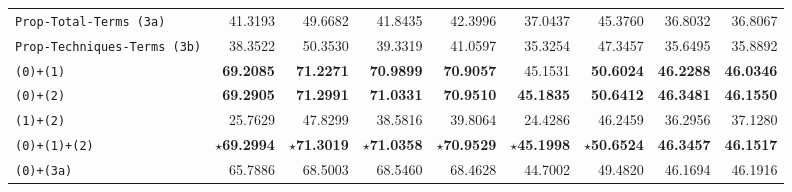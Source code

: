 \begin{table}[!htbp]
{\begin{tabular}{l|rr|rr|rr|rr}
            \texttt{Prop-Total-Terms (3a)}      & 41.3193                                        & 49.6682                                      & 41.8435                                       & 42.3996                                     & 37.0437                 & 45.3760                 & 36.8032                 & 36.8067                 \\
            \texttt{Prop-Techniques-Terms (3b)} & 38.3522                                        & 50.3530                                      & 39.3319                                       & 41.0597                                     & 35.3254                 & 47.3457                 & 35.6495                 & 35.8892                 \\
            \hline
            \texttt{(0)+(1)}                    & \textbf{69.2085}                               & \textbf{71.2271}                             & \textbf{70.9899}                              & \textbf{70.9057}                            & 45.1531                 & \textbf{50.6024}        & \textbf{46.2288}        & \textbf{46.0346}        \\
            \texttt{(0)+(2)}                    & \textbf{69.2905}                               & \textbf{71.2991}                             & \textbf{71.0331}                              & \textbf{70.9510}                            & \textbf{45.1835}        & \textbf{50.6412}        & \textbf{46.3481}        & \textbf{46.1550}        \\
            \texttt{(1)+(2)}                    & 25.7629                                        & 47.8299                                      & 38.5816                                       & 39.8064                                     & 24.4286                 & 46.2459                 & 36.2956                 & 37.1280                 \\
            \texttt{(0)+(1)+(2)}                & \textbf{$\star$69.2994}                        & \textbf{$\star$71.3019}                      & \textbf{$\star$71.0358}                       & \textbf{$\star$70.9529}                     & \textbf{$\star$45.1998} & \textbf{$\star$50.6524} & \textbf{46.3457}        & \textbf{46.1517}        \\
            \texttt{(0)+(3a)}                   & 65.7886                                        & 68.5003                                      & 68.5460                                       & 68.4628                                     & 44.7002                 & 49.4820                 & 46.1694                 & 46.1916                 \\

\end{tabular}}
\end{table}
